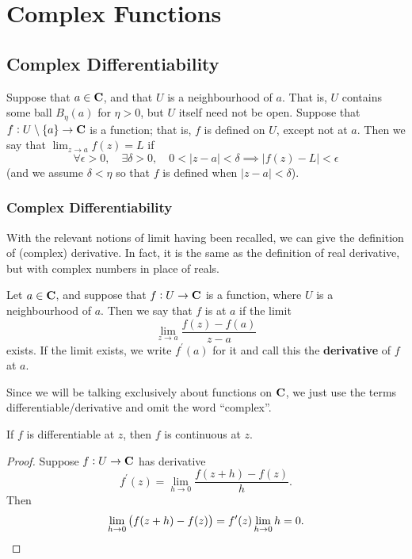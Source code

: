 \chapter{Complex Functions}
\section{Complex Differentiability}
Suppose that $a\in\mathbf C$, and that $U$ is a neighbourhood of $a$. That is, $U$ contains some ball $B_\eta(a)$ for $\eta>0$, but $U$ itself need not be open. Suppose that $f:U\setminus\{a\}\to\mathbf C$ is a function; that is, $f$ is defined on $U$, except not at $a$. Then we say that $\displaystyle\lim_{z\to a}f(z)=L$ if
\[\forall\epsilon>0,\quad\exists\delta>0,\quad 0<|z-a|<\delta\implies|f(z)-L|<\epsilon\]
(and we assume $\delta<\eta$ so that $f$ is defined when $|z-a|<\delta$).

\subsection{Complex Differentiability}
With the relevant notions of limit having been recalled, we can give the definition of (complex) derivative. In fact, it is the same as the definition of real derivative, but with complex numbers in place of reals.

\begin{definition}
Let $a\in\mathbf C$, and suppose that $f:U\to\mathbf C$ is a function, where $U$ is a neighbourhood of $a$. Then we say that $f$ is  at $a$ if the limit
\[\lim_{z\to a}\frac{f(z)-f(a)}{z-a}\]
exists. If the limit exists, we write $f^\prime(a)$ for it and call this the \textbf{derivative} of $f$ at $a$.
\end{definition}

Since we will be talking exclusively about functions on $\mathbf C$, we just use the terms differentiable/derivative and omit the word ``complex''.

\begin{proposition}
If $f$ is differentiable at $z$, then $f$ is continuous at $z$.
\end{proposition}

\begin{proof}
Suppose $f:U\to\mathbf C$ has derivative 
\[f^\prime(z)=\lim_{h\to0}\frac{f(z+h)-f(z)}{h}.\]
Then
\[\lim_{h\to0}\left(f(z+h)-f(z)\right)=f^\prime(z)\lim_{h\to0}h=0.\]
\end{proof}

